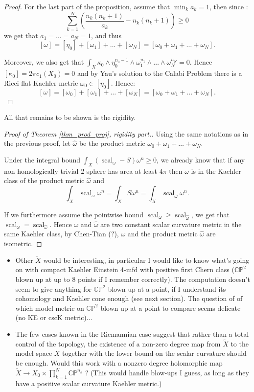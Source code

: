 \documentclass{amsart}
\numberwithin{equation}{section}
\theoremstyle {definition}
\DeclareMathOperator{\scal}{scal}
\begin{document}
\begin{proof}
For the last part of the proposition, assume that $\min_k a_k=1$, then since :
\[\sum_{k=1}^N\left(\frac{n_k(n_k+1)}{a_k}-n_k(n_k+1)\right)\geq 0\] we get that $a_1=\dots=a_N=1$, and thus
\[[\omega]=[\eta_0]+[\omega_1]+\dots+[\omega_N]=[\omega_0+\omega_1+\dots+\omega_N].\]

Moreover, we also get that $\int_X\kappa_0\wedge\eta_0^{n_0-1}\wedge\omega_1^{n_1}\wedge\dots\wedge\omega_N^{n_N}=0$. Hence $[\kappa_0]=2\pi c_1(X_0)=0$ and by Yau's solution to the Calabi Problem there is a Ricci flat Kaehler metric $\omega_0\in[\eta_0]$. Hence:
\[[\omega]=[\omega_0]+[\omega_1]+\dots+[\omega_N]=[\omega_0+\omega_1+\dots+\omega_N].\]

\end{proof}

All that remains to be shown is the rigidity.
\begin{proof}[Proof of Theorem \ref{thm_prod_proj}, rigidity part.]
    Using the same notations as in the previous proof, let $\hat\omega$ be the product metric $\omega_0+\omega_1+\dots+\omega_N$.

    Under the integral bound $\int_X(\scal_\omega-S)\omega^n\geq 0$, we already know that if any non homologically trivial 2-sphere has area at least $4\pi$ then $\omega$ is in the Kaehler class of the product metric $\hat\omega$ and \[\int_X\scal_\omega\omega^n=\int_X S\omega^n=\int_X\scal_{\hat\omega}\omega^n.\]

    If we furthermore assume the pointwise bound $\scal_\omega\geq\scal_{\hat\omega}$, we get that $\scal_\omega=\scal_{\hat\omega}$. Hence $\omega$ and $\hat\omega$ are two constant scalar curvature metric in the same Kaehler class, by Chen-Tian (?), $\omega$ and the product metric $\hat\omega$ are isometric.
\end{proof}



\begin{itemize}
\item Other $\tilde X$ would be interesting, in particular I would like to know what's going on with compact Kaehler Einstein 4-mfd with positive first Chern class ($\mathbb{CP}^2$ blown up at up to 8 points if I remember correctly). The computation doesn't seem to give anything for $\mathbb{CP}^2$ blown up at a point, if I understand its cohomology and Kaehler cone enough (see next section). The question of of which model metric on $\mathbb{CP}^2$ blown up at a point to compare seems delicate (no KE or cscK metric)...
\item The few cases known in the Riemannian case suggest that rather than a total control of the topology, the existence of a non-zero degree map from $\tilde X$ to the model space $X$ together with the lower bound on the scalar curvature should be enough. Would this work with a nonzero degree holomorphic map  $\tilde X\to X_0\times\prod_{k=1}^N\mathbb{CP}^{n_k}$ ? (This would handle blow-ups I guess, as long as they have a positive scalar curvature Kaehler metric.)
\end{itemize}
\end{document}
